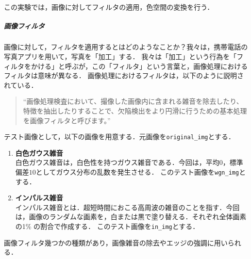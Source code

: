 \chapter{\kadaib}
\section{\purpose}
この実験では，画像に対してフィルタの適用，色空間の変換を行う．\par
\paragraph{画像フィルタ} 画像に対して，フィルタを適用するとはどのようなことか？我々は，携帯電話の写真アプリを用いて，写真を「加工」する．
我々は「加工」という行為を「フィルタをかける」と呼ぶが，この「フィルタ」という言葉と，画像処理におけるフィルタは意味が異なる．
画像処理におけるフィルタは，以下のように説明されている．
\begin{quote}
    ``画像処理検査において、撮像した画像内に含まれる雑音を除去したり、特徴を抽出したりすることで、欠陥検出をより円滑に行うための基本処理を画像フィルタと呼びます。''\hfill\cite{画像フィルタ}
\end{quote}
\newcommand{\originimg}{\texttt{original\_img}}
テスト画像として，以下の画像を用意する．元画像を\originimg とする．
\setlength{\columnseprule}{0.1mm}
\begin{enumerate}
    \item \textbf{白色ガウス雑音}\\
          \newcommand{\wgnimg}{\texttt{wgn\_img}}
          白色ガウス雑音は，白色性を持つガウス雑音である．今回は，平均\(0\)，標準偏差\(10\)としてガウス分布の乱数を発生させる．
          このテスト画像を\wgnimg とする．
    \item \textbf{インパルス雑音}\\
          \newcommand{\inimg}{\texttt{in\_img}}
          インパルス雑音とは．超短時間におこる高周波の雑音のことを指す．今回は，画像のランダムな画素を，白または黒で塗り替える．それぞれ全体画素の1\% の割合で作成する．
          このテスト画像を\inimg とする．
\end{enumerate}
画像フィルタ幾つかの種類があり，画像雑音の除去やエッジの強調に用いられる．
